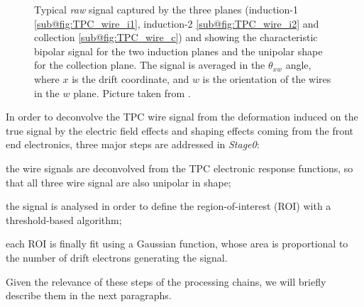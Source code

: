 \begin{figure}
    \centering
    \caption[TPC plane signal]{Typical \emph{raw} signal captured by the three planes (induction-1 \ref{sub@fig:TPC_wire_i1}, induction-2 \ref{sub@fig:TPC_wire_i2} and collection \ref{sub@fig:TPC_wire_c}) and showing the characteristic bipolar signal for the two induction planes and the unipolar shape for the collection plane. The signal is averaged in the $\theta_{xw}$ angle, where $x$ is the drift coordinate, and $w$ is the orientation of the wires in the $w$ plane. Picture taken from \cite{ICARUS:2024hmk}. }
    \label{fig:TPC_signal}
\end{figure}

In order to deconvolve the TPC wire signal from the deformation induced on the true signal by the electric field effects and shaping effects coming from the front end electronics, three major steps are addressed in \emph{Stage0}: \begin{inparaenum}
    \item the wire signals are deconvolved from the TPC electronic response functions, so that all three wire signal are also unipolar in shape;
    \item the signal is analysed in order to define the region-of-interest (ROI) with a threshold-based algorithm; 
    \item each ROI is finally fit using a Gaussian function, whose area is proportional to the number of drift electrons generating the signal. 
\end{inparaenum} Given the relevance of these steps of the processing chains, we will briefly describe them in the next paragraphs.

